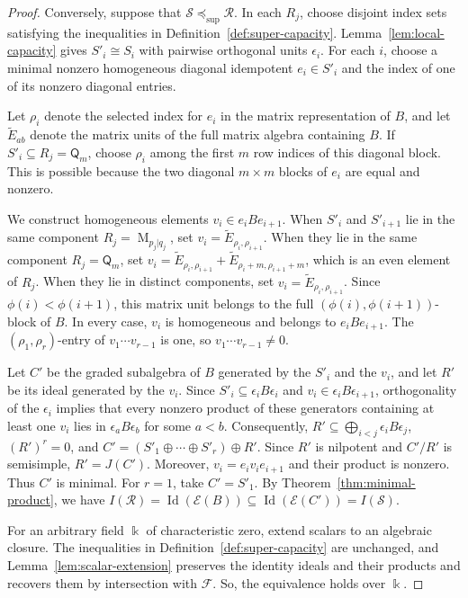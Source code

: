 \documentclass[11pt,reqno]{amsart}
\newcommand{\kk}{\Bbbk}
\newcommand{\F}{\mathcal F}
\newcommand{\E}{\mathcal E}
\newcommand{\Id}{\operatorname{Id}}
\newcommand{\Mat}{\operatorname{M}}
\newcommand{\Qtype}{\mathsf Q}
\theoremstyle{definition}
\theoremstyle{remark}
\numberwithin{equation}{section}
\begin{document}
\begin{proof}
Conversely, suppose that $\mathcal S\preceq_{\mathrm{sup}}\mathcal R$.
In each $R_j$, choose disjoint index sets satisfying the
inequalities in Definition~\ref{def:super-capacity}.
Lemma~\ref{lem:local-capacity} gives
$S'_i\cong S_i$ with pairwise orthogonal units $\epsilon_i$.
For each $i$, choose a minimal nonzero homogeneous diagonal
idempotent $e_i\in S'_i$ and the index of one of its
nonzero diagonal entries.

Let $\rho_i$ denote the selected index for $e_i$ in the
matrix representation of $B$, and let $\widetilde E_{ab}$
denote the matrix units of the full matrix algebra
containing $B$.
If $S'_i\subseteq R_j=\Qtype_m$, choose $\rho_i$ among
the first $m$ row indices of this diagonal block.
This is possible because the two diagonal $m\times m$
blocks of $e_i$ are equal and nonzero.

We construct homogeneous elements $v_i\in e_iBe_{i+1}$.
When $S'_i$ and $S'_{i+1}$ lie in the same component
$R_j=\Mat_{p_j|q_j}$, set
$v_i=\widetilde E_{\rho_i,\rho_{i+1}}$.
When they lie in the same component $R_j=\Qtype_m$, set
$v_i=\widetilde E_{\rho_i,\rho_{i+1}}
+\widetilde E_{\rho_i+m,\rho_{i+1}+m}$,
which is an even element of $R_j$.
When they lie in distinct components, set
$v_i=\widetilde E_{\rho_i,\rho_{i+1}}$.
Since $\phi(i)<\phi(i+1)$, this matrix unit belongs
to the full $(\phi(i),\phi(i+1))$-block of $B$.
In every case, $v_i$ is homogeneous and belongs to
$e_iBe_{i+1}$.
The $(\rho_1,\rho_r)$-entry of $v_1\cdots v_{r-1}$
is one, so $v_1\cdots v_{r-1}\ne0$.

Let $C'$ be the graded subalgebra of $B$ generated by the $S'_i$ and the $v_i$, and let $R'$ be its ideal generated by the $v_i$.
Since $S'_i\subseteq\epsilon_iB\epsilon_i$ and
$v_i\in\epsilon_iB\epsilon_{i+1}$, orthogonality of
the $\epsilon_i$ implies that every nonzero product
of these generators containing at least one $v_i$
lies in $\epsilon_aB\epsilon_b$ for some $a<b$.
 Consequently,
$
R'\subseteq\bigoplus_{i<j}\epsilon_iB\epsilon_j$, $(R')^r=0$, and
$C'=(S'_1\oplus\cdots\oplus S'_r)\oplus R'$.
Since $R'$ is nilpotent and $C'/R'$ is semisimple, $R'=J(C')$. Moreover, $v_i=e_iv_ie_{i+1}$ and their product is nonzero. Thus $C'$ is minimal. For $r=1$, take $C'=S'_1$.  By Theorem~\ref{thm:minimal-product}, we have $
I(\mathcal R)=\Id(\E(B))
\subseteq\Id(\E(C'))=I(\mathcal S)$.

For an arbitrary field $\kk$ of characteristic zero, extend
scalars to an algebraic closure.
The inequalities in Definition~\ref{def:super-capacity} are unchanged,
and Lemma~\ref{lem:scalar-extension} preserves the identity ideals
and their products and recovers them by intersection with $\F$.
So, the equivalence  holds over $\kk$.
\end{proof}
\end{document}
